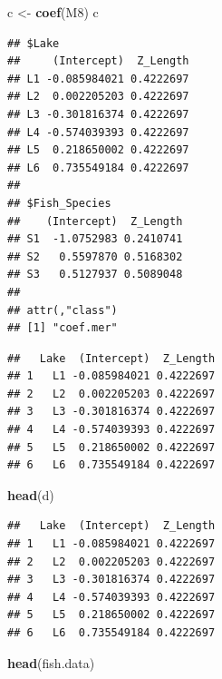 \documentclass[
]{article}
\newenvironment{Shaded}{\begin{snugshade}}{\end{snugshade}}
\newcommand{\FunctionTok}[1]{\textcolor[rgb]{0.13,0.29,0.53}{\textbf{#1}}}
\newcommand{\NormalTok}[1]{#1}
\newcommand{\OtherTok}[1]{\textcolor[rgb]{0.56,0.35,0.01}{#1}}
\newcommand{\SpecialCharTok}[1]{\textcolor[rgb]{0.81,0.36,0.00}{\textbf{#1}}}
\newcommand{\StringTok}[1]{\textcolor[rgb]{0.31,0.60,0.02}{#1}}
\begin{document}
\begin{Shaded}
\begin{Highlighting}[]
\NormalTok{c }\OtherTok{\textless{}{-}} \FunctionTok{coef}\NormalTok{(M8)}
\NormalTok{c}
\end{Highlighting}
\end{Shaded}

\begin{verbatim}
## $Lake
##     (Intercept)  Z_Length
## L1 -0.085984021 0.4222697
## L2  0.002205203 0.4222697
## L3 -0.301816374 0.4222697
## L4 -0.574039393 0.4222697
## L5  0.218650002 0.4222697
## L6  0.735549184 0.4222697
## 
## $Fish_Species
##    (Intercept)  Z_Length
## S1  -1.0752983 0.2410741
## S2   0.5597870 0.5168302
## S3   0.5127937 0.5089048
## 
## attr(,"class")
## [1] "coef.mer"
\end{verbatim}

\begin{Shaded}
\end{Shaded}

\begin{verbatim}
##   Lake  (Intercept)  Z_Length
## 1   L1 -0.085984021 0.4222697
## 2   L2  0.002205203 0.4222697
## 3   L3 -0.301816374 0.4222697
## 4   L4 -0.574039393 0.4222697
## 5   L5  0.218650002 0.4222697
## 6   L6  0.735549184 0.4222697
\end{verbatim}

\begin{Shaded}
\begin{Highlighting}[]
\FunctionTok{head}\NormalTok{(d)}
\end{Highlighting}
\end{Shaded}

\begin{verbatim}
##   Lake  (Intercept)  Z_Length
## 1   L1 -0.085984021 0.4222697
## 2   L2  0.002205203 0.4222697
## 3   L3 -0.301816374 0.4222697
## 4   L4 -0.574039393 0.4222697
## 5   L5  0.218650002 0.4222697
## 6   L6  0.735549184 0.4222697
\end{verbatim}

\begin{Shaded}
\begin{Highlighting}[]
\FunctionTok{head}\NormalTok{(fish.data)}
\end{Highlighting}
\end{Shaded}
\end{document}
